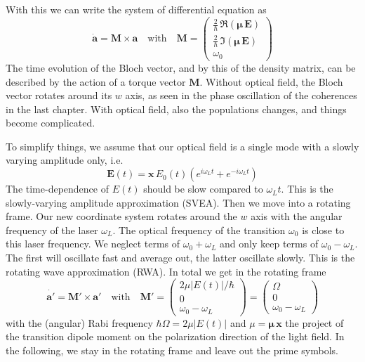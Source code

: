 With this we can write the system of differential equation as 
\[
 \dot{\boldsymbol{a}} = \boldsymbol{M}   \times \boldsymbol{a} 
 \quad \text{with} \quad 
 \boldsymbol{M}  = 
 \begin{pmatrix}
 \frac{2}{\hbar} \, \Re ( \boldsymbol{\mu} \, \boldsymbol{E} ) \\
  \frac{2}{\hbar} \, \Im ( \boldsymbol{\mu} \, \boldsymbol{E} ) \\
  \omega_0
 \end{pmatrix}
\]
The time evolution of the Bloch vector, and by this of the density matrix, can be described by the action of a torque vector $\boldsymbol{M}$. Without optical field, the Bloch vector rotates around its $w$ axis, as seen in the phase oscillation of the coherences in the last chapter. With optical field, also the populations changes, and things become complicated.

To simplify things, we assume that our optical field is a single mode with a slowly varying amplitude only, i.e.
\[
 \boldsymbol{E}(t) = \boldsymbol{x} \, E_0(t) \left( e^{i \omega_L t} + e^{-i \omega_L t} \right)
\]
The time-dependence of $E(t)$ should be slow compared to $\omega_L t$. This is the slowly-varying amplitude approximation (SVEA). Then we move into a rotating frame. Our new coordinate system rotates around the $w$ axis with the angular frequency of the laser $\omega_L$. The optical frequency of the transition $\omega_0$ is close to this laser frequency. We neglect terms of $\omega_0 + \omega_L$ and only keep terms of  $\omega_0 - \omega_L$. The first will oscillate fast and average out, the latter oscillate slowly. This is the rotating wave approximation (RWA). In total we get in the rotating frame 
\[
 \dot{\boldsymbol{a}'} = \boldsymbol{M}'   \times \boldsymbol{a}' 
 \quad \text{with} \quad 
 \boldsymbol{M}'  = 
 \begin{pmatrix}
2 \mu    |E(t)| / \hbar \\
0 \\
\omega_0 - \omega_L
 \end{pmatrix} = 
  \begin{pmatrix}
\Omega \\
0 \\
\omega_0 - \omega_L
 \end{pmatrix}
\]
with the (angular) Rabi frequency $\hbar \Omega = 2 \mu    |E(t)| $ and $\mu = \boldsymbol{\mu \, x}$ the project of the transition dipole moment on the polarization direction of the light field. In the following, we stay in the rotating frame and leave out the prime symbols.


